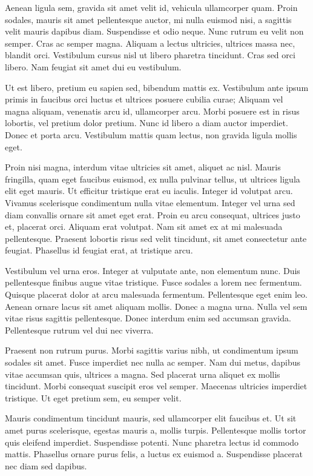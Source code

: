 Aenean ligula sem, gravida sit amet velit id, vehicula ullamcorper quam. Proin sodales, mauris sit amet pellentesque auctor, mi nulla euismod nisi, a sagittis velit mauris dapibus diam. Suspendisse et odio neque. Nunc rutrum eu velit non semper. Cras ac semper magna. Aliquam a lectus ultricies, ultrices massa nec, blandit orci. Vestibulum cursus nisl ut libero pharetra tincidunt. Cras sed orci libero. Nam feugiat sit amet dui eu vestibulum.

Ut est libero, pretium eu sapien sed, bibendum mattis ex. Vestibulum ante ipsum primis in faucibus orci luctus et ultrices posuere cubilia curae; Aliquam vel magna aliquam, venenatis arcu id, ullamcorper arcu. Morbi posuere est in risus lobortis, vel pretium dolor pretium. Nunc id libero a diam auctor imperdiet. Donec et porta arcu. Vestibulum mattis quam lectus, non gravida ligula mollis eget.

Proin nisi magna, interdum vitae ultricies sit amet, aliquet ac nisl. Mauris fringilla, quam eget faucibus euismod, ex nulla pulvinar tellus, ut ultrices ligula elit eget mauris. Ut efficitur tristique erat eu iaculis. Integer id volutpat arcu. Vivamus scelerisque condimentum nulla vitae elementum. Integer vel urna sed diam convallis ornare sit amet eget erat. Proin eu arcu consequat, ultrices justo et, placerat orci. Aliquam erat volutpat. Nam sit amet ex at mi malesuada pellentesque. Praesent lobortis risus sed velit tincidunt, sit amet consectetur ante feugiat. Phasellus id feugiat erat, at tristique arcu.

Vestibulum vel urna eros. Integer at vulputate ante, non elementum nunc. Duis pellentesque finibus augue vitae tristique. Fusce sodales a lorem nec fermentum. Quisque placerat dolor at arcu malesuada fermentum. Pellentesque eget enim leo. Aenean ornare lacus sit amet aliquam mollis. Donec a magna urna. Nulla vel sem vitae risus sagittis pellentesque. Donec interdum enim sed accumsan gravida. Pellentesque rutrum vel dui nec viverra.

Praesent non rutrum purus. Morbi sagittis varius nibh, ut condimentum ipsum sodales sit amet. Fusce imperdiet nec nulla ac semper. Nam dui metus, dapibus vitae accumsan quis, ultrices a magna. Sed placerat urna aliquet ex mollis tincidunt. Morbi consequat suscipit eros vel semper. Maecenas ultricies imperdiet tristique. Ut eget pretium sem, eu semper velit.

Mauris condimentum tincidunt mauris, sed ullamcorper elit faucibus et. Ut sit amet purus scelerisque, egestas mauris a, mollis turpis. Pellentesque mollis tortor quis eleifend imperdiet. Suspendisse potenti. Nunc pharetra lectus id commodo mattis. Phasellus ornare purus felis, a luctus ex euismod a. Suspendisse placerat nec diam sed dapibus.

